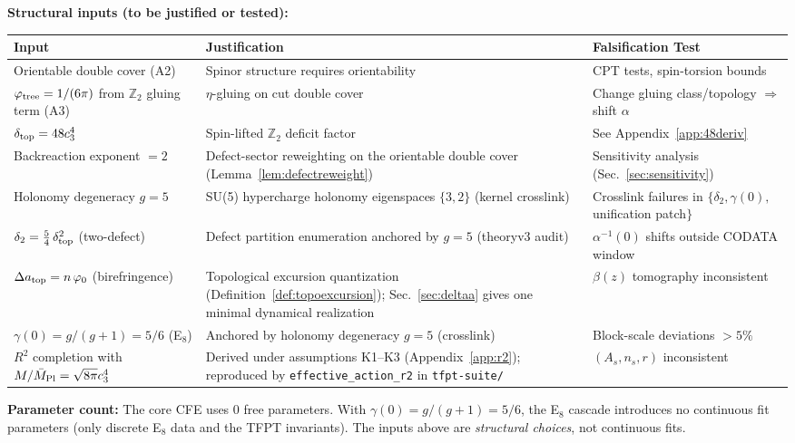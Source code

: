 \begin{tcolorbox}[colback=yellow!5, colframe=yellow!60!black, 
    title={\textbf{Assumption Ledger: Established vs.\ New}}, fonttitle=\bfseries]
\textbf{Structural inputs (to be justified or tested):}
\begin{center}
\begin{tabular}{@{}p{4cm}p{4cm}p{4.5cm}@{}}
\toprule
\textbf{Input} & \textbf{Justification} & \textbf{Falsification Test}\\
\midrule
Orientable double cover (A2) & Spinor structure requires orientability & CPT tests, spin-torsion bounds\\
$\varphi_{\mathrm{tree}} = 1/(6\pi)$ from $\mathbb{Z}_2$ gluing term (A3) & $\eta$-gluing on cut double cover & Change gluing class/topology $\Rightarrow$ shift $\alpha$\\
$\delta_{\mathrm{top}} = 48c_3^4$ & Spin-lifted $\mathbb{Z}_2$ deficit factor & See Appendix~\ref{app:48deriv}\\
Backreaction exponent $=2$ & Defect-sector reweighting on the orientable double cover (Lemma~\ref{lem:defectreweight}) & Sensitivity analysis (Sec.~\ref{sec:sensitivity})\\
Holonomy degeneracy $g=5$ & SU(5) hypercharge holonomy eigenspaces $\{3,2\}$ (kernel crosslink) & Crosslink failures in $\{\delta_2,\gamma(0),$ unification patch$\}$\\
$\delta_2=\frac54\,\delta_{\mathrm{top}}^2$ (two-defect) & Defect partition enumeration anchored by $g=5$ (theoryv3 audit) & $\alpha^{-1}(0)$ shifts outside CODATA window\\
$\Delta a_{\text{top}} = n\,\varphi_0$ (birefringence) & Topological excursion quantization (Definition~\ref{def:topoexcursion}); Sec.~\ref{sec:deltaa} gives one minimal dynamical realization & $\beta(z)$ tomography inconsistent\\
$\gamma(0)=g/(g+1)=5/6$ (E$_8$) & Anchored by holonomy degeneracy $g=5$ (crosslink) & Block-scale deviations $>5\%$\\
$R^2$ completion with $M/\bar{M}_{\mathrm{Pl}}=\sqrt{8\pi}c_3^4$ & Derived under assumptions K1--K3 (Appendix~\ref{app:r2}); reproduced by \texttt{effective\_action\_r2} in \texttt{tfpt-suite/} & $(A_s,n_s,r)$ inconsistent\\
\bottomrule
\end{tabular}
\end{center}

\textbf{Parameter count:} The core CFE uses 0 free parameters. With $\gamma(0)=g/(g+1)=5/6$, the E$_8$ cascade 
introduces no continuous fit parameters (only discrete E$_8$ data and the TFPT invariants). 
The inputs above are \emph{structural choices}, not continuous fits.
\end{tcolorbox}

